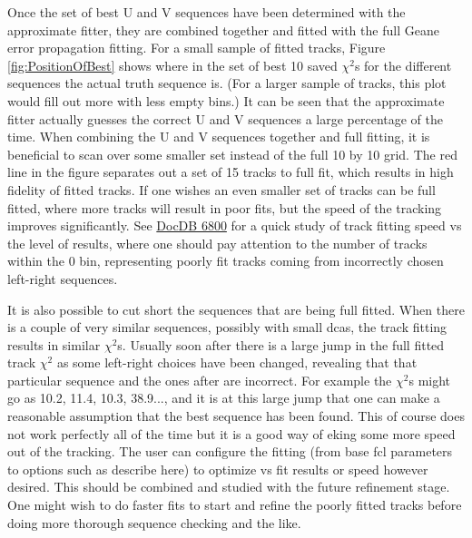  	  Once the set of best U and V sequences have been determined with the approximate fitter, they are combined together and fitted with the full Geane error propagation fitting. For a small sample of fitted tracks, Figure \ref{fig:PositionOfBest} shows where in the set of best 10 saved $\chi^{2}$s for the different sequences the actual truth sequence is. (For a larger sample of tracks, this plot would fill out more with less empty bins.) It can be seen that the approximate fitter actually guesses the correct U and V sequences a large percentage of the time. When combining the U and V sequences together and full fitting, it is beneficial to scan over some smaller set instead of the full 10 by 10 grid. The red line in the figure separates out a set of 15 tracks to full fit, which results in high fidelity of fitted tracks. If one wishes an even smaller set of tracks can be full fitted, where more tracks will result in poor fits, but the speed of the tracking improves significantly. See \href{https://gm2-docdb.fnal.gov/cgi-bin/private/ShowDocument?docid=6800}{DocDB 6800} for a quick study of track fitting speed vs the level of results, where one should pay attention to the number of tracks within the 0 bin, representing poorly fit tracks coming from incorrectly chosen left-right sequences. 

 	  It is also possible to cut short the sequences that are being full fitted. When there is a couple of very similar sequences, possibly with small dcas, the track fitting results in similar $\chi^{2}$s. Usually soon after there is a large jump in the full fitted track $\chi^{2}$ as some left-right choices have been changed, revealing that that particular sequence and the ones after are incorrect. For example the $\chi^{2}$s might go as 10.2, 11.4, 10.3, 38.9..., and it is at this large jump that one can make a reasonable assumption that the best sequence has been found. This of course does not work perfectly all of the time but it is a good way of eking some more speed out of the tracking. The user can configure the fitting (from base fcl parameters to options such as describe here) to optimize vs fit results or speed however desired. This should be combined and studied with the future refinement stage. One might wish to do faster fits to start and refine the poorly fitted tracks before doing more thorough sequence checking and the like.

